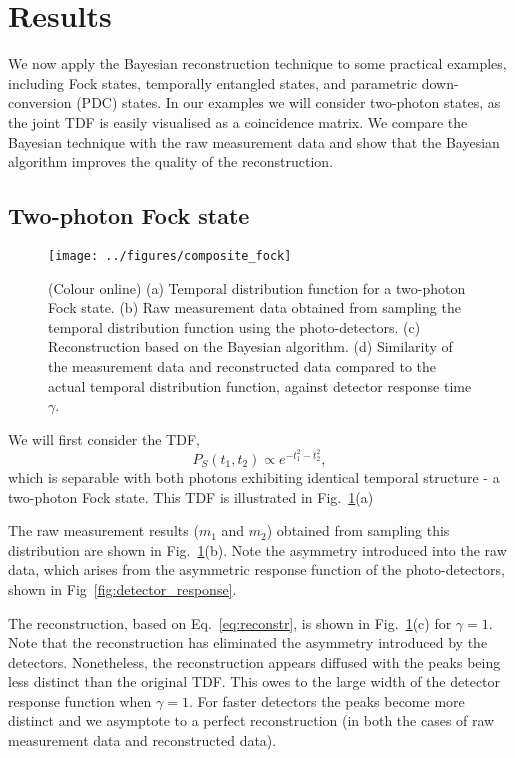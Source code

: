 \documentclass[aps,pra,twocolumn,amsmath,amssymb,color,superscriptaddress]{revtex4}
\begin{document}
%
%

\section{Results}

We now apply the Bayesian reconstruction technique to some practical examples, including Fock states, temporally entangled states, and parametric down-conversion (PDC) states. In our examples we will consider two-photon states, as the joint TDF is easily visualised as a coincidence matrix. We compare the Bayesian technique with the raw measurement data and show that the Bayesian algorithm improves the quality of the reconstruction.

%
%

\subsection{Two-photon Fock state}

\begin{figure}[!htb]
\texttt{[image: ../figures/composite\_fock]}
\caption{(Colour online) (a) Temporal distribution function for a two-photon Fock state. (b) Raw measurement data obtained from sampling the temporal distribution function using the photo-detectors. (c) Reconstruction based on the Bayesian algorithm. (d) Similarity of the measurement data and reconstructed data compared to the actual temporal distribution function, against detector response time $\gamma$.} \label{fig:composite_fock}
\end{figure}

We will first consider the TDF,
\begin{equation} \label{eq:spectral_gaussian}
P_S(t_{1}, t_{2}) \propto e^{-t_{1}^{2}-t_{2}^{2}},
\end{equation}
which is separable with both photons exhibiting identical temporal structure - a two-photon Fock state. This TDF is illustrated in Fig.~\ref{fig:composite_fock}(a)

The raw measurement results ($m_1$ and $m_2$) obtained from sampling this distribution are shown in Fig.~\ref{fig:composite_fock}(b). Note the asymmetry introduced into the raw data, which arises from the asymmetric response function of the photo-detectors, shown in Fig~\ref{fig:detector_response}.

The reconstruction, based on Eq.~\ref{eq:reconstr}, is shown in Fig.~\ref{fig:composite_fock}(c) for \mbox{$\gamma=1$}. Note that the reconstruction has eliminated the asymmetry introduced by the detectors. Nonetheless, the reconstruction appears diffused with the peaks being less distinct than the original TDF. This owes to the large width of the detector response function when \mbox{$\gamma=1$}. For faster detectors the peaks become more distinct and we asymptote to a perfect reconstruction (in both the cases of raw measurement data and reconstructed data).
\end{document}
